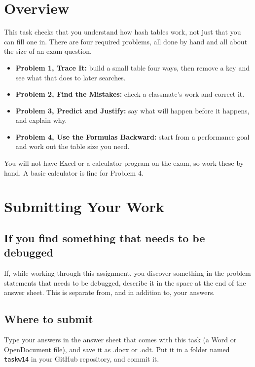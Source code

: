 \documentclass[11pt]{article}
\begin{document}
\AssignmentTitleBlock
\AIDisclaimer

\section{Overview}

This task checks that you understand how hash tables work, not just that you can fill one
in. There are four required problems, all done by hand and all about the size of an exam
question.

\begin{itemize}[leftmargin=1.4em]
  \item \textbf{Problem 1, Trace It:} build a small table four ways, then remove a key and
    see what that does to later searches.
  \item \textbf{Problem 2, Find the Mistakes:} check a classmate's work and correct it.
  \item \textbf{Problem 3, Predict and Justify:} say what will happen before it happens,
    and explain why.
  \item \textbf{Problem 4, Use the Formulas Backward:} start from a performance goal and
    work out the table size you need.
\end{itemize}

You will not have Excel or a calculator program on the exam, so work these by hand. A basic
calculator is fine for Problem 4.

\section{Submitting Your Work}

\subsection*{If you find something that needs to be debugged}
If, while working through this assignment, you discover something in the problem statements
that needs to be debugged, describe it in the space at the end of the answer sheet. This is
separate from, and in addition to, your answers.

\subsection*{Where to submit}
Type your answers in the answer sheet that comes with this task (a Word or OpenDocument
file), and save it as .docx or .odt. Put it in a folder named \texttt{taskw14} in your GitHub
repository, and commit it.
\end{document}
